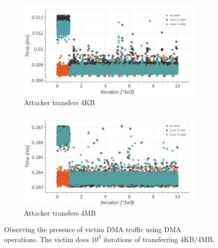 \begin{figure}
     \centering
     
     \begin{subfigure}[b]{\textwidth}
        \centering
        \includegraphics[width=\textwidth]{figures/interconnect-sc/dma/dma_contention_4KB.png}
        \caption{Attacker transfers 4KB}
        \label{fig:dma-contention-4kb}
     \end{subfigure}
     
     \hfill
     
     \begin{subfigure}[b]{\textwidth}
         \centering
        \includegraphics[width=\textwidth]{figures/interconnect-sc/dma/dma_contention_4MB.png}
        \caption{Attacker transfers 4MB}
        \label{fig:dma-contention-4mb}
     \end{subfigure}
     
    \caption{Observing the presence of victim DMA traffic using DMA operations. The victim does $10^3$ iterations of transferring 4KB/4MB.}
    \label{fig:dma-contention}
\end{figure}


